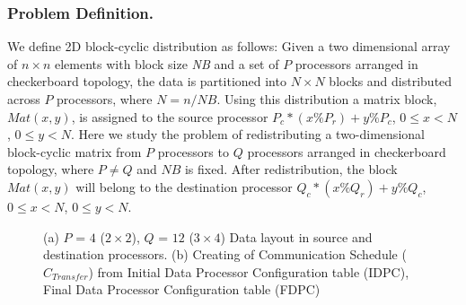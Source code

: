 \documentclass[letterpaper]{llncs}
\begin{document}
\subsubsection{Problem Definition.}
We define 2D block-cyclic distribution as follows: Given a two dimensional array of $n \times n$ elements with block size \textit{NB} 
and a set of $P$ processors arranged in checkerboard topology, the data is partitioned into $N \times N$ blocks 
and distributed across $P$  processors, where $N = n/NB$.
Using this distribution a matrix block, $Mat(x, y)$, is assigned to the source processor $P_{c} \ast (x\% P_{r})+y\%P_{c}$, $0 \leq x < N$, $0 \leq y< N$.
Here we study the problem of redistributing a two-dimensional block-cyclic matrix from $P$ processors to 
$Q$ processors arranged in checkerboard topology, where $P \neq Q$ and $NB$ is fixed. After redistribution, the block 
$Mat(x, y)$ will belong  to the destination processor $Q_{c} \ast (x\% Q_{r})+y\% Q_{c}$, $0 \leq x < N$, $0 \leq y < N$.

\begin{figure}[!ht]
\flushleft
{}
\caption{(a) $P$ = $4$ ($2\times 2$), $Q$ = $12$ ($3 \times 4$)  Data layout in source and destination proce\-ssors. (b) Creating of Communication Schedule ($C_{Transfer}$) from
Initial Data Processor Configuration table (IDPC), Final Data Processor Configuration table (FDPC)}
\end{figure}
\end{document}
